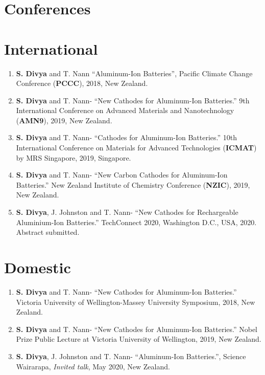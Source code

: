 \section*{\centering Conferences}
\section*{International}
\begin{enumerate}
    \item \textbf{S. Divya} and T. Nann \enquote{Aluminum-Ion Batteries}, Pacific Climate Change Conference (\textbf{PCCC}), 2018, New Zealand.
    \item \textbf{S. Divya} and T. Nann- \enquote{New Cathodes for Aluminum-Ion Batteries.} 9th International Conference on Advanced Materials and Nanotechnology (\textbf{AMN9}), 2019, New Zealand.
    \item \textbf{S. Divya} and T. Nann- \enquote{Cathodes for Aluminum-Ion Batteries.} 10th International Conference on Materials for Advanced Technologies (\textbf{ICMAT}) by MRS Singapore, 2019, Singapore.
     \item \textbf{S. Divya} and T. Nann- \enquote{New Carbon Cathodes for Aluminum-Ion Batteries.} New Zealand Institute of Chemistry Conference (\textbf{NZIC}), 2019, New Zealand.
     \item \textbf{S. Divya}, J. Johnston and T. Nann- \enquote{New Cathodes for Rechargeable Aluminium-Ion Batteries.} TechConnect 2020, Washington D.C., USA, 2020. Abstract submitted.
\end{enumerate}
\section*{Domestic}   
\begin{enumerate}
     \item \textbf{S. Divya} and T. Nann- \enquote{New Cathodes for Aluminum-Ion Batteries.} Victoria University of Wellington-Massey University Symposium, 2018, New Zealand.
      \item \textbf{S. Divya} and T. Nann- \enquote{New Cathodes for Aluminum-Ion Batteries.} Nobel Prize Public Lecture at Victoria University of Wellington, 2019, New Zealand.
      \item \textbf{S. Divya}, J. Johnston and T. Nann- \enquote{Aluminum-Ion Batteries.}, Science Wairarapa, \textit{Invited talk}, May 2020, New Zealand.
\end{enumerate}

